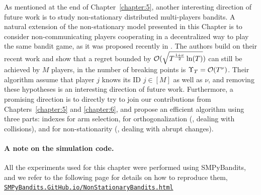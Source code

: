 As mentioned at the end of Chapter~\ref{chapter:5}, another interesting direction of future work is to study non-stationary distributed multi-players bandits.
A natural extension of the non-stationary model presented in this Chapter is to consider non-communicating players cooperating in a decentralized way to play the same bandit game, as it was proposed recently in \cite{WeiSrivastava18Distributed}.
The authors build on their recent work \cite{WeiSrivastava18Abruptly} and show that a regret bounded by $\mathcal{O}(\sqrt{T^{\frac{1+\nu}{2}} \ln(T)})$ can still be achieved by $M$ players, in the number of breaking points is $\Upsilon_T = \mathcal{O}(T^{\nu})$.
Their algorithm assume that player $j$ knows its ID $j\in[M]$ as well as $\nu$, and removing these hypotheses is an interesting direction of future work.
Furthermore, a promising direction is to directly try to join our contributions from Chapters~\ref{chapter:5} and \ref{chapter:6}, and propose an efficient algorithm using three parts:
\klUCB{} indexes for arm selection,
\MCTopM{} for orthogonalization (\ie, dealing with collisions),
and \GLRklUCB{} for non-stationarity (\ie, dealing with abrupt changes).
%



\paragraph{A note on the simulation code.}
%
All the experiments used for this chapter were performed using SMPyBandits,
and we refer to the following page for details on how to reproduce them,
\href{https://SMPyBandits.GitHub.io/NonStationaryBandits.html}{\texttt{SMPyBandits.GitHub.io/NonStationaryBandits.html}}
